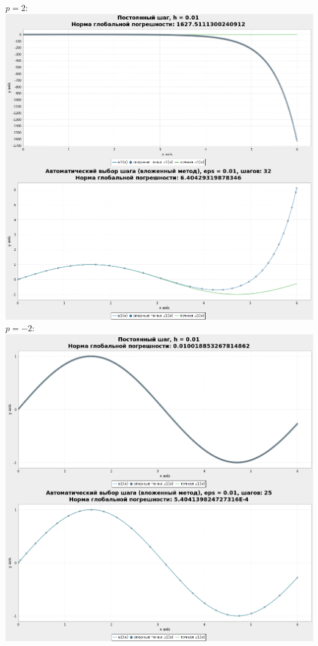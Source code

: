 \documentclass[a4paper,12pt]{article}
\begin{document}
\begin{flushleft}
\begin{enumerate}
      $p = 2:$\linebreak\linebreak\includegraphics{sc2.png}\linebreak\linebreak
      $p = -2:$\linebreak\linebreak\includegraphics{scm2.png}\linebreak\linebreak

\end{enumerate}
\end{flushleft}
\end{document}
